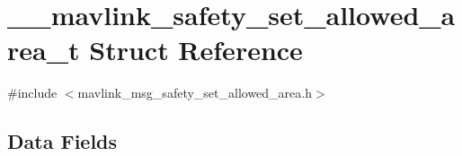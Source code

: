 \hypertarget{struct____mavlink__safety__set__allowed__area__t}{\section{\-\_\-\-\_\-mavlink\-\_\-safety\-\_\-set\-\_\-allowed\-\_\-area\-\_\-t Struct Reference}
\label{struct____mavlink__safety__set__allowed__area__t}
}


{\ttfamily \#include $<$mavlink\-\_\-msg\-\_\-safety\-\_\-set\-\_\-allowed\-\_\-area.\-h$>$}

\subsection*{Data Fields}
